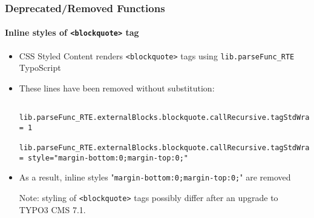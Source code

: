 
\begin{frame}[fragile]
	\frametitle{Deprecated/Removed Functions}
	\framesubtitle{Inline styles of \texttt{<blockquote>} tag}

	\lstset{basicstyle=\tiny\ttfamily}

	\begin{itemize}

		\item CSS Styled Content renders \texttt{<blockquote>} tags using \texttt{lib.parseFunc\_RTE} TypoScript
		\item These lines have been removed without substitution:

			\begin{lstlisting}
				lib.parseFunc_RTE.externalBlocks.blockquote.callRecursive.tagStdWrap.HTMLparser = 1
				lib.parseFunc_RTE.externalBlocks.blockquote.callRecursive.tagStdWrap.HTMLparser.tags.blockquote.overrideAttribs = style="margin-bottom:0;margin-top:0;"
			\end{lstlisting}

		\item As a result, inline styles "\texttt{margin-bottom:0;margin-top:0;}"\newline
			are removed

			\vspace{0.2cm}

			\begingroup
				\color{red}
					Note: styling of \texttt{<blockquote>} tags possibly differ after an
					upgrade to TYPO3 CMS 7.1.
			\endgroup

	\end{itemize}

\end{frame}


